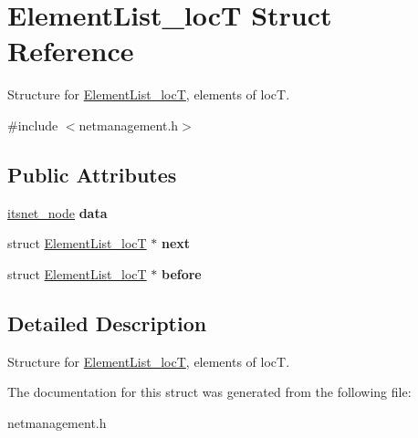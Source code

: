 \hypertarget{structElementList__locT}{\section{\-Element\-List\-\_\-loc\-T \-Struct \-Reference}
\label{structElementList__locT}
}


\-Structure for \hyperlink{structElementList__locT}{\-Element\-List\-\_\-loc\-T}, elements of loc\-T.  




{\ttfamily \#include $<$netmanagement.\-h$>$}

\subsection*{\-Public \-Attributes}
\begin{DoxyCompactItemize}
\item 
\hypertarget{structElementList__locT_a02a327c3d87c01690fef3784134be88e}{\hyperlink{structitsnet__node__}{itsnet\-\_\-node} {\bfseries data}}\label{structElementList__locT_a02a327c3d87c01690fef3784134be88e}

\item 
\hypertarget{structElementList__locT_a33e5d3416dedb0441ef0613fab92c617}{struct \hyperlink{structElementList__locT}{\-Element\-List\-\_\-loc\-T} $\ast$ {\bfseries next}}\label{structElementList__locT_a33e5d3416dedb0441ef0613fab92c617}

\item 
\hypertarget{structElementList__locT_a398b24f383d775181003c8b011139067}{struct \hyperlink{structElementList__locT}{\-Element\-List\-\_\-loc\-T} $\ast$ {\bfseries before}}\label{structElementList__locT_a398b24f383d775181003c8b011139067}

\end{DoxyCompactItemize}


\subsection{\-Detailed \-Description}
\-Structure for \hyperlink{structElementList__locT}{\-Element\-List\-\_\-loc\-T}, elements of loc\-T. 

\-The documentation for this struct was generated from the following file\-:\begin{DoxyCompactItemize}
\item 
netmanagement.\-h\end{DoxyCompactItemize}
